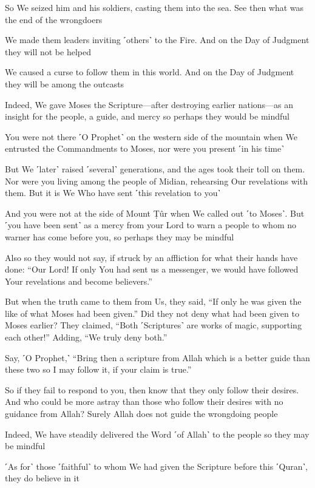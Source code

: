 So We seized him and his soldiers, casting them into the sea. See then what was the end of the wrongdoers

We made them leaders inviting ˹others˺ to the Fire. And on the Day of Judgment they will not be helped

We caused a curse to follow them in this world. And on the Day of Judgment they will be among the outcasts

Indeed, We gave Moses the Scripture—after destroying earlier nations—as an insight for the people, a guide, and mercy so perhaps they would be mindful

You were not there ˹O Prophet˺ on the western side of the mountain when We entrusted the Commandments to Moses, nor were you present ˹in his time˺

But We ˹later˺ raised ˹several˺ generations, and the ages took their toll on them. Nor were you living among the people of Midian, rehearsing Our revelations with them. But it is We Who have sent ˹this revelation to you˺

And you were not at the side of Mount Ṭûr when We called out ˹to Moses˺. But ˹you have been sent˺ as a mercy from your Lord to warn a people to whom no warner has come before you, so perhaps they may be mindful

Also so they would not say, if struck by an affliction for what their hands have done: “Our Lord! If only You had sent us a messenger, we would have followed Your revelations and become believers.”

But when the truth came to them from Us, they said, “If only he was given the like of what Moses had been given.” Did they not deny what had been given to Moses earlier? They claimed, “Both ˹Scriptures˺ are works of magic, supporting each other!” Adding, “We truly deny both.”

Say, ˹O Prophet,˺ “Bring then a scripture from Allah which is a better guide than these two so I may follow it, if your claim is true.”

So if they fail to respond to you, then know that they only follow their desires. And who could be more astray than those who follow their desires with no guidance from Allah? Surely Allah does not guide the wrongdoing people

Indeed, We have steadily delivered the Word ˹of Allah˺ to the people so they may be mindful

˹As for˺ those ˹faithful˺ to whom We had given the Scripture before this ˹Quran˺, they do believe in it

